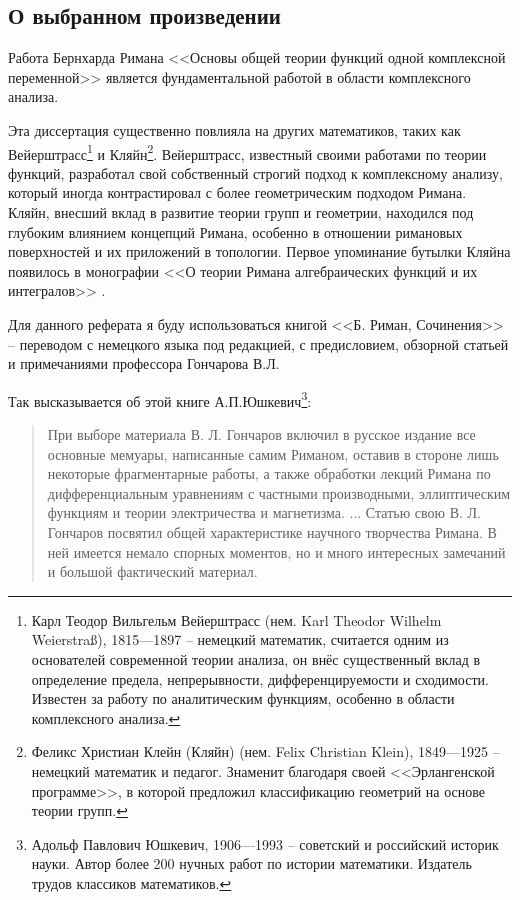 \documentclass[a4paper,12pt]{article}
\theoremstyle{remark}
\begin{document}
\subsection{О выбранном произведении}

Работа Бернхарда Римана <<Основы общей теории функций одной комплексной переменной>> \cite{Dissertation}
является фундаментальной работой в области комплексного анализа.

Эта диссертация существенно повлияла на других математиков, таких
как Вейерштрасс\footnote{
  Карл Теодор Вильгельм Вейерштрасс (нем. Karl Theodor Wilhelm Weierstraß), 1815—1897 --
  немецкий математик, считается одним из основателей современной
  теории анализа, он внёс существенный вклад в определение предела, непрерывности, дифференцируемости и сходимости.
  Известен за работу по аналитическим функциям, особенно в области комплексного анализа.
} и Кляйн\footnote{
  Феликс Христиан Клейн (Кляйн) (нем. Felix Christian Klein), 1849—1925 --
  немецкий математик и педагог. Знаменит благодаря своей
  <<Эрлангенской программе>>, в которой предложил классификацию
  геометрий на основе теории групп.
}. Вейерштрасс, известный своими работами по теории функций,
разработал свой собственный строгий подход к комплексному анализу,
который иногда контрастировал с более геометрическим подходом Римана\cite{Contrasts}.
Кляйн, внесший вклад в развитие теории групп и геометрии, находился под
глубоким влиянием концепций Римана, особенно в отношении римановых
поверхностей и их приложений в топологии. Первое упоминание
бутылки Кляйна появилось в монографии <<О теории Римана
алгебраических функций и их интегралов>> \cite{Klein}.

Для данного реферата я буду использоваться книгой <<Б. Риман, Сочинения>> \cite{Essays} --
переводом с немецкого языка под редакцией, с предисловием, обзорной статьей
и примечаниями профессора Гончарова В.Л.

Так высказывается об этой книге А.П.Юшкевич\footnote{
  Адольф Павлович Юшкевич, 1906—1993 --
  советский и российский историк науки. Автор более 200 нучных работ
  по истории математики. Издатель трудов классиков математиков.
}:
\begin{quotation}
  При выборе материала В. Л. Гончаров включил в русское издание все основные
  мемуары, написанные самим Риманом, оставив в стороне лишь некоторые
  фрагментарные работы, а также обработки лекций Римана по дифференциальным
  уравнениям с частными производными, эллиптическим функциям и теории электричества и магнетизма. ...
  Статью свою В. Л. Гончаров посвятил общей характеристике научного
  творчества Римана. В ней имеется немало спорных моментов, но
  и много интересных замечаний и большой фактический материал.
\end{quotation}
\end{document}
